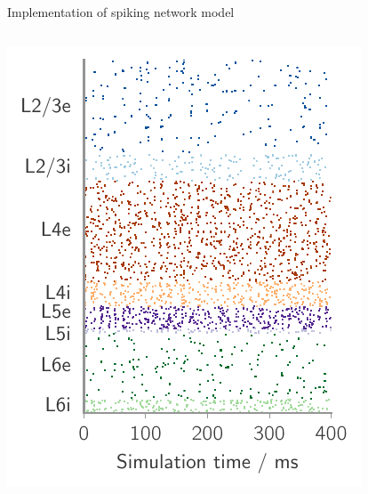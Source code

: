 \documentclass[xcolor=x11names,compress]{beamer}
\renewcommand{\(}{\begin{columns}}
\renewcommand{\)}{\end{columns}}
\newcommand{\<}[1]{\begin{column}{#1}}
\renewcommand{\>}{\end{column}}
\begin{document}
\begin{frame}[t]{Implementation of spiking network model}
\begin{columns}[T]
\begin{column}[T]{5cm}
            \includegraphics[width=1.0\linewidth]{../figures/raster_plot_sli}
    \end{column}
    \end{columns}
\end{frame}
\end{document}
